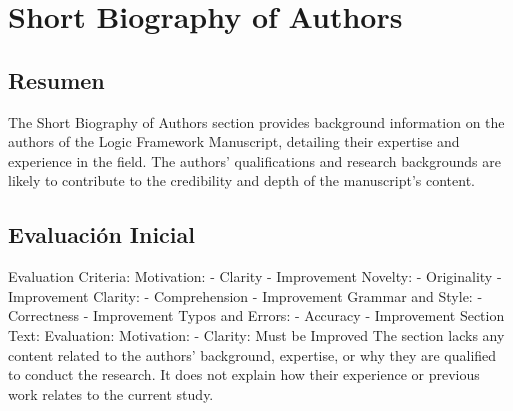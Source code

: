 \documentclass{article}%
\begin{document}
%
\section{Short Biography of Authors}%
\label{sec:ShortBiographyofAuthors}%
\subsection{Resumen}%
\label{subsec:Resumen}%
The Short Biography of Authors section provides background information on the authors of the Logic Framework Manuscript, detailing their expertise and experience in the field. The authors' qualifications and research backgrounds are likely to contribute to the credibility and depth of the manuscript's content.

%
\subsection{Evaluación Inicial}%
\label{subsec:EvaluacinInicial}%
Evaluation Criteria: \newline%
Motivation: \newline%
{-} Clarity\newline%
{-} Improvement\newline%
Novelty: \newline%
{-} Originality\newline%
{-} Improvement\newline%
Clarity: \newline%
{-} Comprehension\newline%
{-} Improvement\newline%
Grammar and Style: \newline%
{-} Correctness\newline%
{-} Improvement\newline%
Typos and Errors: \newline%
{-} Accuracy\newline%
{-} Improvement\newline%
\newline%
Section Text: \newline%
\newline%
Evaluation: \newline%
Motivation:\newline%
{-} Clarity: Must be Improved\newline%
The section lacks any content related to the authors' background, expertise, or why they are qualified to conduct the research. It does not explain how their experience or previous work relates to the current study.\newline%
\end{document}
